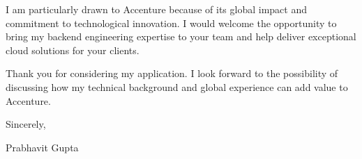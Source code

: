 \documentclass[11pt,a4paper]{article}
\begin{document}
\vspace{1em}
I am particularly drawn to Accenture because of its global impact and commitment to technological innovation. I would welcome the opportunity to bring my backend engineering expertise to your team and help deliver exceptional cloud solutions for your clients.

\vspace{1em}
Thank you for considering my application. I look forward to the possibility of discussing how my technical background and global experience can add value to Accenture.

\vspace{2em}
\noindent Sincerely,

\vspace{1em}
\noindent Prabhavit Gupta
\end{document}

